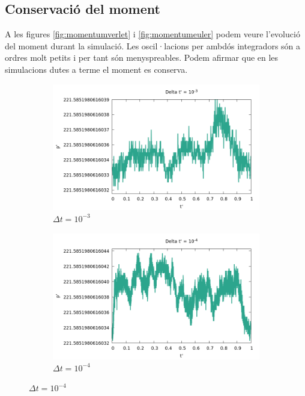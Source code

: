 \documentclass[a4paper,10pt]{article}
\begin{document}
\subsection{Conservació del moment}

A les figures \ref{fig:momentumverlet} i \ref{fig:momentumeuler} podem veure l'evolució del moment durant la simulació. Les oscil·lacions per ambdós integradors són a ordres molt petits i per tant són menyspreables. Podem afirmar que en les simulacions dutes a terme el moment es conserva.

\begin{figure}[h]
	\centering
	\begin{subfigure}{0.3\linewidth}
		\includegraphics[width=\linewidth]{momentum_verlet_1}
		\caption{$\Delta t = 10^{-3}$}
		\label{fig:momentumverlet1}
	\end{subfigure}
	\begin{subfigure}{0.3\linewidth}
		\includegraphics[width=\linewidth]{momentum_verlet_2}
		\caption{$\Delta t = 10^{-4}$}
		\label{fig:momentumverlet2}

\end{subfigure}
\end{figure}
\end{document}
